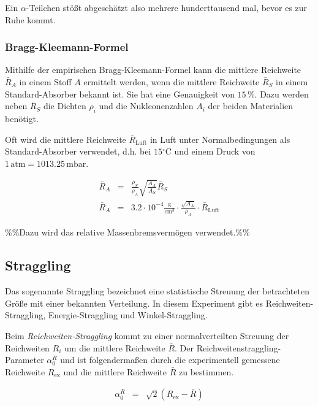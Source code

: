 \documentclass[12pt,a4paper]{scrartcl}
\numberwithin{equation}{section} %
\renewcommand{\[}{} %
\renewcommand{\]}{\noindent} %
\begin{document}
\noindent
Ein \(\alpha\)-Teilchen stößt abgeschätzt also mehrere hunderttausend
mal, bevor es zur Ruhe kommt.

\hypertarget{bragg-kleemann-formel}{%
\subsubsection{Bragg-Kleemann-Formel}\label{bragg-kleemann-formel}}

Mithilfe der empirischen Bragg-Kleemann-Formel kann die mittlere
Reichweite \(\bar R_A\) in einem Stoff \(A\) ermittelt werden, wenn die
mittlere Reichweite \(\bar R_S\) in einem Standard-Absorber bekannt ist.
Sie hat eine Genauigkeit von \(15\,\%\). Dazu werden neben \(\bar R_S\)
die Dichten \(\rho_i\) und die Nukleonenzahlen \(A_i\) der beiden
Materialien benötigt.

Oft wird die mittlere Reichweite \(\bar R_\mathrm{Luft}\) in Luft unter
Normalbedingungen als Standard-Absorber verwendet, d.h. bei
\(15\mathrm{^\circ C}\) und einem Druck von
\(1\mathrm{\,atm}=1013.25\mathrm{\,mbar}\).

\[
\begin{eqnarray}
    \bar R_A &=& \frac{\rho_S}{\rho_A}
        \sqrt{\frac{A_A}{A_S}} \bar R_S \\
    \bar R_A &=& 3.2\cdot 10^{-4} \mathrm{\frac{g}{cm^3}}
        \cdot\frac{\sqrt{A_A}}{\rho_A}\cdot \bar R_\mathrm{Luft}
\end{eqnarray}
\]

\%\%Dazu wird das relative Massenbremsvermögen verwendet.\%\%

\hypertarget{straggling}{%
\subsection{Straggling}\label{straggling}}

Das sogenannte Straggling bezeichnet eine statistische Streuung der
betrachteten Größe mit einer bekannten Verteilung. In diesem Experiment
gibt es Reichweiten-Straggling, Energie-Straggling und
Winkel-Straggling.

Beim \emph{Reichweiten-Straggling} kommt zu einer normalverteilten
Streuung der Reichweiten \(R_i\) um die mittlere Reichweite \(\bar{R}\).
Der Reichweitenstraggling-Parameter \(\alpha^R_0\) und ist
folgendermaßen durch die experimentell gemessene Reichweite
\(R_\mathrm{ex}\) und die mittlere Reichweite \(\bar{R}\) zu bestimmen.

\[
\begin{eqnarray}
    \alpha^R_0 &=& \sqrt{2}\left(R_\mathrm{ex}-\bar{R}\right)
\end{eqnarray}
\]
\end{document}
